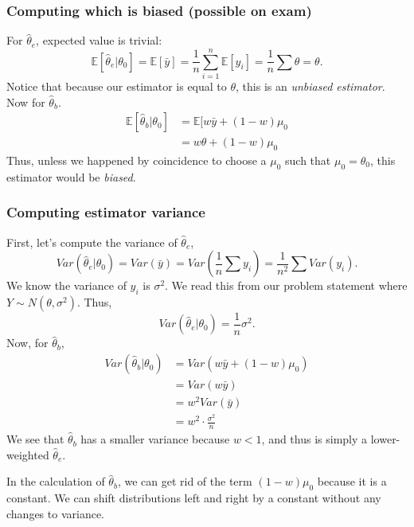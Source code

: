 \documentclass[titlepage, 12pt, leqno]{article}
\begin{document}
\subsubsection{Computing which is biased (possible on exam)}
For $\hat \theta_{e}$, expected value is trivial:
\[
    \mathbb{E}[\hat \theta_{e}|\theta_{0}] = \mathbb{E}[\bar y] = 
    \frac{1}{n}\sum_{i=1}^{n} \mathbb{E}[y_{i}] = \frac{1}{n}\sum \theta =
    \theta.
\]
Notice that because our estimator is equal to $\theta$, this is an \textit{
unbiased estimator}. Now for $\hat \theta_{b}$.
\begin{align*}
    \mathbb{E}[\hat \theta_{b}|\theta_{0}] &= \mathbb{E}[w\bar y + 
    (1-w)\mu_{0}\\
                                           &= w\theta + (1-w)\mu_{0}
\end{align*}
Thus, unless we happened by coincidence to choose a $\mu_{0}$ such that
$\mu_{0} = \theta_{0}$, this estimator would be \textit{biased}.

\subsubsection{Computing estimator variance}
First, let's compute the variance of $\hat \theta_{e}$,
\[
Var(\hat \theta_{e} | \theta_{0}) = Var(\bar y) = Var(\frac{1}{n}\sum y_{i}) =
\frac{1}{n^{2}}\sum Var(y_{i}).
\]
We know the variance of $y_{i}$ is $\sigma^{2}$. We read this from our problem
statement where $Y \sim N(\theta, \sigma^{2})$. Thus,
\[
Var(\hat \theta_{e}|\theta_{0}) = \frac{1}{n}\sigma^{2}.
\]
Now, for $\hat \theta_{b}$,
\begin{align*}
    Var(\hat \theta_{b}|\theta_{0}) &= Var(w\bar y + (1-w)\mu_{0})\\
                                    &= Var(w\bar y) \\
                                    &= w^{2}Var(\bar y) \\
                                    &= w^{2} \cdot \frac{\sigma^{2}}{n}
\end{align*}
We see that $\hat \theta_{b}$ has a smaller variance because $w < 1$, and thus
is simply a lower-weighted $\hat \theta_{e}$.

\begin{note}
    In the calculation of $\hat \theta_{b}$, we can get rid of the term
    $(1-w)\mu_{0}$ because it is a constant. We can shift distributions left
    and right by a constant without any changes to variance.
\end{note}
\end{document}

